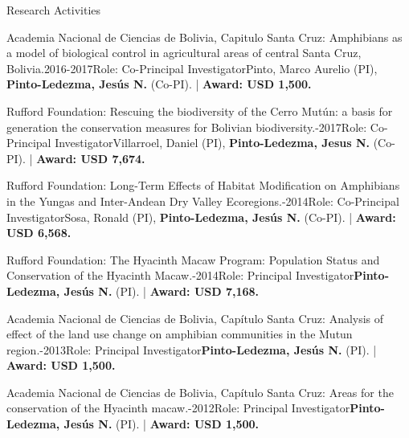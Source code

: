 \documentclass{resume} %
\begin{document}
\begin{rSection}{Research Activities}
\begin{pSubsection}{Academia Nacional de Ciencias de Bolivia, Capitulo Santa Cruz: }{\normalfont Amphibians as a model of biological control in agricultural areas of central Santa Cruz, Bolivia.}{2016-2017}{\normalfont Role: Co-Principal Investigator}{\normalfont Pinto, Marco Aurelio (PI), \textbf{Pinto-Ledezma, Jesús N.} (Co-PI). | {\bf Award: USD 1,500.}}
\end{pSubsection}

\begin{pSubsection}{Rufford Foundation: }{\normalfont Rescuing the biodiversity of the Cerro Mutún: a basis for generation the conservation measures for Bolivian biodiversity.}{-2017}{\normalfont Role: Co-Principal Investigator}{\normalfont Villarroel, Daniel (PI), \textbf{Pinto-Ledezma, Jesus N.} (Co-PI). | {\bf Award: USD 7,674.}}
\end{pSubsection}

\begin{pSubsection}{Rufford Foundation: }{\normalfont Long-Term Effects of Habitat Modification on Amphibians in the Yungas and Inter-Andean Dry Valley Ecoregions.}{-2014}{\normalfont Role: Co-Principal Investigator}{\normalfont Sosa, Ronald (PI), \textbf{Pinto-Ledezma, Jesús N.} (Co-PI). | {\bf Award: USD 6,568.}}
\end{pSubsection}

\begin{pSubsection}{Rufford Foundation: }{\normalfont The Hyacinth Macaw Program: Population Status and Conservation of the Hyacinth Macaw.}{-2014}{\normalfont Role: Principal Investigator}{\textbf{Pinto-Ledezma, Jesús N.} \normalfont (PI). | {\bf Award: USD 7,168.}}
\end{pSubsection}

\begin{pSubsection}{Academia Nacional de Ciencias de Bolivia, Capítulo Santa Cruz: }{\normalfont Analysis of effect of the land use change on amphibian communities in the Mutun region.}{-2013}{\normalfont Role: Principal Investigator}{\textbf{Pinto-Ledezma, Jesús N.} \normalfont (PI). | {\bf Award: USD 1,500.}}
\end{pSubsection}

\begin{pSubsection}{Academia Nacional de Ciencias de Bolivia, Capítulo Santa Cruz: }{\normalfont Areas for the conservation of the Hyacinth macaw.}{-2012}{\normalfont Role: Principal Investigator}{\textbf{Pinto-Ledezma, Jesús N.} \normalfont (PI). | {\bf Award: USD 1,500.}}
\end{pSubsection}


\end{rSection}
\end{document}
